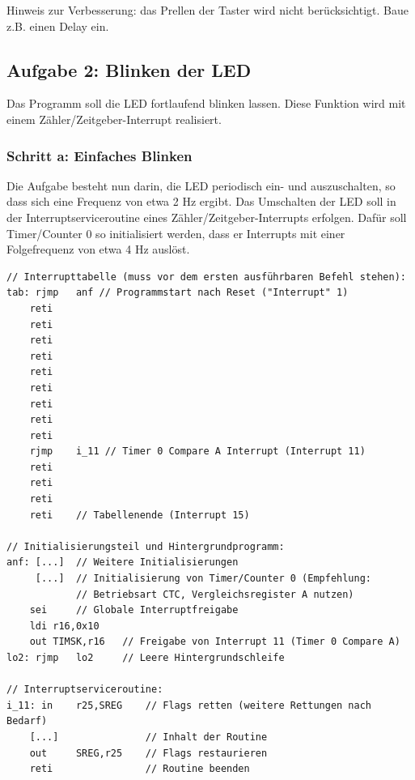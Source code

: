 \documentclass[a4paper,12pt,titlepage]{scrartcl}
\begin{document}
Hinweis zur Verbesserung: das Prellen der Taster wird nicht berücksichtigt. Baue z.B. einen Delay ein.

\newpage
\subsection*{Aufgabe 2: Blinken der LED}
Das Programm soll die LED fortlaufend blinken lassen. Diese Funktion wird mit einem Zähler/Zeitgeber-Interrupt realisiert.

\subsubsection*{Schritt a: Einfaches Blinken}
Die Aufgabe besteht nun darin, die LED periodisch ein- und auszuschalten, so dass sich eine Frequenz von etwa 2 Hz ergibt. Das Umschalten der LED soll in der Interruptserviceroutine eines Zähler/Zeitgeber-Interrupts erfolgen. Dafür soll Timer/Counter 0 so initialisiert werden, dass er Interrupts mit einer Folgefrequenz von etwa 4 Hz auslöst.
\begin{lstlisting}[basicstyle=\tiny]
// Interrupttabelle (muss vor dem ersten ausführbaren Befehl stehen):
tab: rjmp   anf // Programmstart nach Reset ("Interrupt" 1)
    reti
    reti
    reti
    reti
    reti
    reti
    reti
    reti
    reti
    rjmp    i_11 // Timer 0 Compare A Interrupt (Interrupt 11)
    reti
    reti
    reti
    reti    // Tabellenende (Interrupt 15)

// Initialisierungsteil und Hintergrundprogramm:
anf: [...]  // Weitere Initialisierungen
     [...]  // Initialisierung von Timer/Counter 0 (Empfehlung:
            // Betriebsart CTC, Vergleichsregister A nutzen)
    sei     // Globale Interruptfreigabe
    ldi r16,0x10
    out TIMSK,r16   // Freigabe von Interrupt 11 (Timer 0 Compare A)
lo2: rjmp   lo2     // Leere Hintergrundschleife

// Interruptserviceroutine:
i_11: in    r25,SREG    // Flags retten (weitere Rettungen nach Bedarf)
    [...]               // Inhalt der Routine
    out     SREG,r25    // Flags restaurieren
    reti                // Routine beenden
\end{lstlisting}
\end{document}
